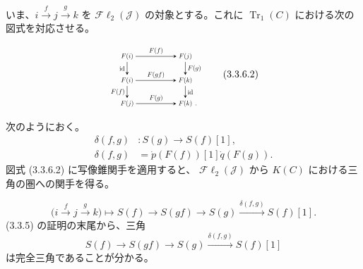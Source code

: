 \clearpage
{}%
\begingroup
\small
\setlength{\abovedisplayskip}{3pt plus 2pt minus 2pt}%
\setlength{\belowdisplayskip}{3pt plus 2pt minus 2pt}%
\setlength{\jot}{2pt}%
いま、$i\xrightarrow{f}j\xrightarrow{g}k$ を
$\mathcal{F}\ell_2(\mathcal{J})$ の対象とする。これに
$\operatorname{Tr}_1(C)$ における次の図式を対応させる。

\begin{equation}
\begin{tikzpicture}[>=stealth,baseline=(current bounding box.center),scale=0.66,
  every node/.style={transform shape}]
  \node (Fi1) at (0,2.55) {$F(i)$};
  \node (Fj1) at (3.15,2.55) {$F(j)$};
  \node (Fi2) at (0,1.25) {$F(i)$};
  \node (Fk1) at (3.15,1.25) {$F(k)$};
  \node (Fj2) at (0,0) {$F(j)$};
  \node (Fk2) at (3.15,0) {$F(k)$};
  \draw[->] (Fi1) -- node[above] {$F(f)$} (Fj1);
  \draw[->] (Fi2) -- node[above] {$F(gf)$} (Fk1);
  \draw[->] (Fj2) -- node[above] {$F(g)$} (Fk2);
  \draw[->] (Fi1) -- node[left] {$\mathrm{id}$} (Fi2);
  \draw[->] (Fj1) -- node[right] {$F(g)$} (Fk1);
  \draw[->] (Fi2) -- node[left] {$F(f)$} (Fj2);
  \draw[->] (Fk1) -- node[right] {$\mathrm{id}$} (Fk2);
  \node[anchor=base west,inner sep=0pt,xshift=.08em] at (Fk2.base east) {$.$};
\end{tikzpicture}
\tag{3.3.6.2}
\end{equation}

次のようにおく。
\begin{equation}
\begin{aligned}
  \delta(f,g)&\colon S(g)\longrightarrow S(f)[1],\\
  \delta(f,g)&=\dot p(F(f))[1]\dot q(F(g)).
\end{aligned}
\tag{3.3.6.3}
\end{equation}
図式 (3.3.6.2) に写像錐関手を適用すると、
$\mathcal{F}\ell_2(\mathcal{J})$ から $K(C)$ における三角の圏への関手を得る。

\begin{equation}
  \bigl(i\xrightarrow{f}j\xrightarrow{g}k\bigr)
  \longmapsto
  S(f)\longrightarrow S(gf)\longrightarrow S(g)
  \xrightarrow{\delta(f,g)}S(f)[1].
  \tag{3.3.6.4}
\end{equation}
(3.3.5) の証明の末尾から、三角
\[
  S(f)\longrightarrow S(gf)\longrightarrow S(g)
  \xrightarrow{\delta(f,g)}S(f)[1]
\]
は完全三角であることが分かる。

